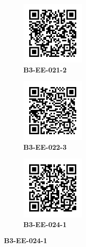 \documentclass{article}
\begin{document}
	\begin{figure}[]
		\centering
		\begin{subfigure}{0.19\textwidth}
			\centering
			\includegraphics[width = 3.2cm,height = 3.2cm]{B3-EE-021-2}
			\caption*{\large{\textbf{B3-EE-021-2}}}
		\end{subfigure}\hfil
		\begin{subfigure}{0.19\textwidth}
			\centering
			\includegraphics[width = 3.2cm,height = 3.2cm]{B3-EE-022-3}
			\caption*{\large{\textbf{B3-EE-022-3}}}
		\end{subfigure}\hfil
		\begin{subfigure}{0.19\textwidth}
			\centering
			\includegraphics[width = 3.2cm,height = 3.2cm]{B3-EE-024-1}
			\caption*{\large{\textbf{B3-EE-024-1}}}
		\end{subfigure}\hfil
	\end{figure}
\end{document}
